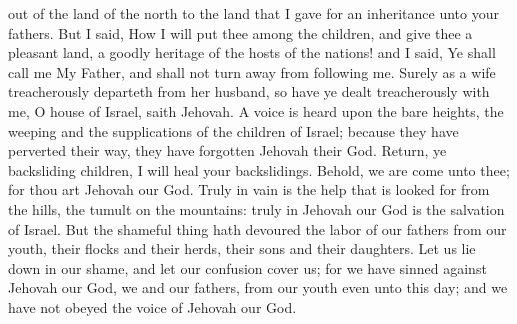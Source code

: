 out of the land of the north to the land that I gave for an inheritance unto your fathers.  But I said, How I will put thee among the children, and give thee a pleasant land, a goodly heritage of the hosts of the nations! and I said, Ye shall call me My Father, and shall not turn away from following me. Surely as a wife treacherously departeth from her husband, so have ye dealt treacherously with me, O house of Israel, saith Jehovah. A voice is heard upon the bare heights, the weeping and the supplications of the children of Israel; because they have perverted their way, they have forgotten Jehovah their God. Return, ye backsliding children, I will heal your backslidings. Behold, we are come unto thee; for thou art Jehovah our God. Truly in vain is the help that is looked for from the hills, the tumult on the mountains: truly in Jehovah our God is the salvation of Israel. But the shameful thing hath devoured the labor of our fathers from our youth, their flocks and their herds, their sons and their daughters. Let us lie down in our shame, and let our confusion cover us; for we have sinned against Jehovah our God, we and our fathers, from our youth even unto this day; and we have not obeyed the voice of Jehovah our God. 

